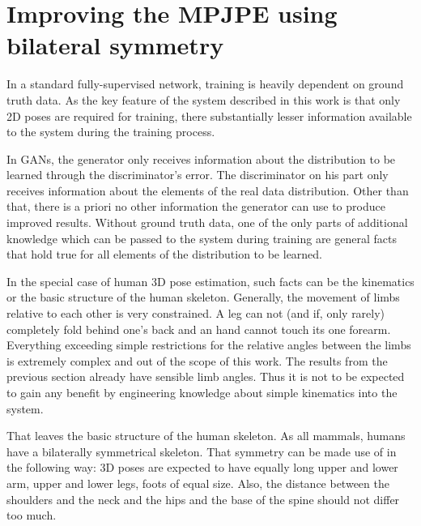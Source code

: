 \section{Improving the MPJPE using bilateral symmetry}

In a standard fully-supervised network, training is heavily dependent on ground truth data.
As the key feature of the system described in this work is that only 2D poses are required for training, there substantially lesser information available to the system during the training process.

In GANs, the generator only receives information about the distribution to be learned through the discriminator's error.
The discriminator on his part only receives information about the elements of the real data distribution.
Other than that, there is a priori no other information the generator can use to produce improved results.
Without ground truth data, one of the only parts of additional knowledge which can be passed to the system during training are general facts that hold true for all elements of the distribution to be learned.

In the special case of human 3D pose estimation, such facts can be the kinematics or the basic structure of the human skeleton.
Generally, the movement of limbs relative to each other is very constrained.
A leg can not (and if, only rarely) completely fold behind one's back and an hand cannot touch its one forearm.
Everything exceeding simple restrictions for the relative angles between the limbs is extremely complex and out of the scope of this work.
The results from the previous section already have sensible limb angles.
Thus it is not to be expected to gain any benefit by engineering knowledge about simple kinematics into the system.

That leaves the basic structure of the human skeleton.
As all mammals, humans have a bilaterally symmetrical skeleton.
That symmetry can be made use of in the following way:
3D poses are expected to have equally long upper and lower arm, upper and lower legs, foots of equal size.
Also, the distance between the shoulders and the neck and the hips and the base of the spine should not differ too much.



